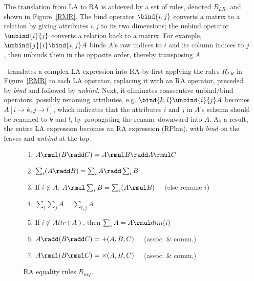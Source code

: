 The translation from LA to RA is achieved by a set of rules, denoted
$R_{LR}$, and shown in Figure~\ref{RMR}. The bind operator
$\bind{i,j}$ converts a matrix to a relation by giving attributes
$i,j$ to its two dimensions; the unbind operator $\unbind{i}{j}$
converts a relation back to a matrix. For example,
$\unbind{j}{i}\bind{i,j}A$ binds $A$'s row indices to $i$ and its
column indices to $j$, then unbinds them in the opposite order,
thereby transposing $A$.

\sys\ translates a complex LA expression into RA by first applying the
rules $R_{LR}$ in Figure~\ref{RMR} to each LA operator, replacing it
with an RA operator, preceded by {\em bind} and followed by {\em
  unbind}. Next, it eliminates consecutive unbind/bind operators,
possibly renaming attributes, e.g.  $\bind{k,l} \unbind{i}{j} A$
becomes $A[i \to k, j \to l]$, which indicates that the attributes $i$
and $j$ in $A$'s schema should be renamed to $k$ and $l$, by
propagating the rename downward into $A$.  As a result, the entire LA
expression becomes an RA expression (RPlan), with {\em bind}
on the leaves and {\em unbind} at the top.

\begin{figure}
\begin{enumerate}
\itemsep0em
  \item\label{RRC_mp} $A \rmul (B \radd C) = A \rmul B \radd A \rmul C$
  \item\label{RRC_ap} $\sum_i (A \radd B) = \sum_i A \radd \sum_i B$
  \item\label{RRC_ma} If $i \not\in A$, $A \rmul \sum_i B = \sum_i (A \rmul B)
    \quad$ (else rename $i$)
  \item\label{RRC_aa} $\sum_i \sum_j A = \sum_{i,j} A$
  \item\label{RRC_ac} If $i \not\in Attr(A)$, then $\sum_i A = A \rmul dim(i)$
  \item\label{RRC_pp} $A \radd (B \radd C) = +(A, B, C) \quad$ (assoc. \& comm.)
  \item\label{RRC_mm} $A \rmul (B \rmul C) = \times (A, B, C) \quad$ (assoc. \& comm.)
\end{enumerate}
\caption{RA equality rules $R_{EQ}$.}
\label{RRC}
\vspace*{3pt}
\end{figure}



